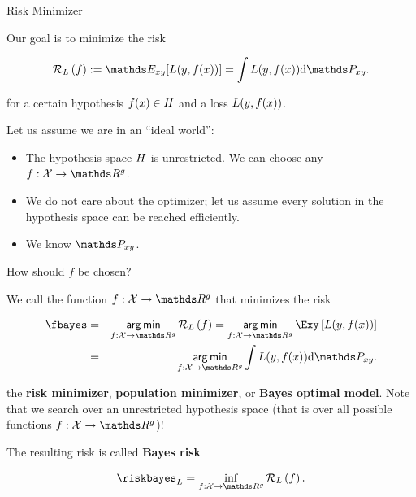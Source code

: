 \begin{vbframe}{Risk Minimizer}

Our goal is to minimize the risk

$$ \risk_L\left(f\right) := \E_{xy} [\Lxy] = \int \Lxy \text{d}\Pxy. $$

for a certain hypothesis $f(x) \in H$ and a loss $L(y, f(x))$. 

\lz 

Let us assume we are in an \enquote{ideal world}: 

\begin{itemize}
	\item The hypothesis space $H$ is unrestricted. We can choose any $f: \Xspace \to \R^g$. 
	\item We do not care about the optimizer; let us assume every solution in the hypothesis space can be reached efficiently. 
	\item We know $\Pxy$. 
\end{itemize}

How should $f$ be chosen? 


\framebreak 

We call the function $f: \Xspace \to \R^g$ that minimizes the risk

\begin{eqnarray*}
	\fbayes &=& \argmin_{f: \Xspace \to \R^g} \risk_L\left(f\right) = \argmin_{f: \Xspace \to \R^g}\Exy\left[\Lxy\right]\\ &=&  \argmin_{f: \Xspace \to \R^g}\int \Lxy \text{d}\Pxy. 
\end{eqnarray*}

the \textbf{risk minimizer}, \textbf{population minimizer}, or \textbf{Bayes optimal model}. Note that we search over an unrestricted hypothesis space (that is over all possible functions $f: \Xspace \to \R^g$)!

\lz 

The resulting risk is called \textbf{Bayes risk}

\begin{eqnarray*}
	\riskbayes_{L} = \inf_{f: \Xspace \to \R^g} \risk_L\left(f\right). 
\end{eqnarray*}

\end{vbframe}

